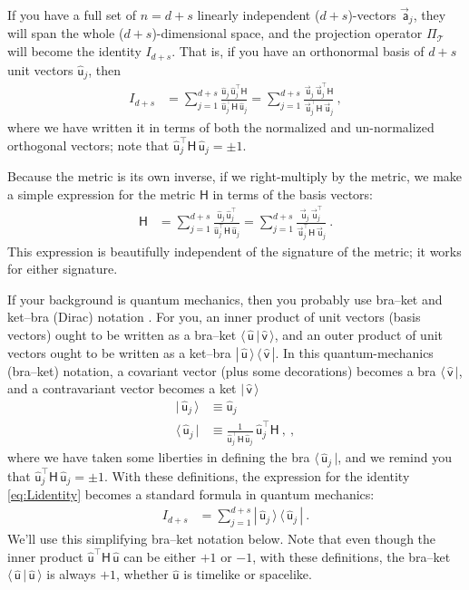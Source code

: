 \documentclass{article}
\newcommand{\metric}{\mathsf{H}}
\newcommand{\proj}{\mathsf{\Pi}}
\newcommand\upvec[1]{\!\vec{\,\mathrm{#1}}}
\newcommand{\Lvec}[1]{\upvec{\mathsf{#1}}} %
\newcommand{\Lhat}[1]{\hat{\mathsf{#1}}} %
\newcommand{\bra}[1]{\langle\,{#1}\,|}
\newcommand{\ket}[1]{|\,{#1}\,\rangle}
\newcommand{\braket}[2]{\langle\,{#1}\,|\,{#2}\,\rangle}
\newcommand{\ketbra}[2]{|\,{#1}\,\rangle\,\langle\,{#2}\,|}
\newcommand{\plus}{\!+\!} %
\begin{document}
If you have a full set of $n=d+s$ linearly independent ($d\plus s$)-vectors $\Lvec{a}_j$, they will span the whole ($d\plus s$)-dimensional space, and the projection operator $\proj_\mathscr{T}$ will become the identity $I_{d+s}$.
That is, if you have an orthonormal basis of $d+s$ unit vectors $\Lhat{u}_j$, then
\begin{align}
    I_{d+s} &= \sum_{j=1}^{d+s} \frac{\Lhat{u}_j\,\Lhat{u}_j^\top\metric}{\Lhat{u}_j^\top\metric\,\Lhat{u}_j} = \sum_{j=1}^{d+s} \frac{\Lvec{u}_j\,\Lvec{u}_j^\top\metric}{\Lvec{u}_j^\top\metric\,\Lvec{u}_j} \label{eq:Lidentity} ~,
\end{align}
where we have written it in terms of both the normalized and un-normalized orthogonal vectors; note that $\Lhat{u}_j^\top\metric\,\Lhat{u}_j=\pm 1$.

Because the metric is its own inverse, if we right-multiply by the metric, we make a simple expression for the metric $\metric$ in terms of the basis vectors:
\begin{align}
    \metric &= \sum_{j=1}^{d+s} \frac{\Lhat{u}_j\,\Lhat{u}_j^\top}{\Lhat{u}_j^\top\metric\,\Lhat{u}_j} = \sum_{j=1}^{d+s} \frac{\Lvec{u}_j\,\Lvec{u}_j^\top}{\Lvec{u}_j^\top\metric\,\Lvec{u}_j} ~.
\end{align}
This expression is beautifully independent of the signature of the metric; it works for either signature.

If your background is quantum mechanics, then you probably use bra--ket and ket--bra (Dirac) notation \cite{dirac}.
For you, an inner product of unit vectors (basis vectors) ought to be written as a bra--ket $\braket{\Lhat{u}}{\Lhat{v}}$, and an outer product of unit vectors ought to be written as a ket--bra $\ketbra{\Lhat{u}}{\Lhat{v}}$.
In this quantum-mechanics (bra--ket) notation, a covariant vector (plus some decorations) becomes a bra $\bra{\Lhat{v}}$, and a contravariant vector becomes a ket $\ket{\Lhat{v}}$
\begin{align}
    \ket{\Lhat{u}_j} &\equiv \Lhat{u}_j \label{eq:ket}\\
    \bra{\Lhat{u}_j} &\equiv \frac{1}{\Lhat{u}_j^\top\metric\,\Lhat{u}_j}\,\Lhat{u}_j^\top\metric ~,\label{eq:bra} ~,
\end{align}
where we have taken some liberties in defining the bra $\bra{\Lhat{u}_j}$, and we remind you that $\Lhat{u}_j^\top\metric\,\Lhat{u}_j=\pm 1$.
With these definitions, the expression for the identity \eqref{eq:Lidentity} becomes a standard formula in quantum mechanics:
\begin{align}
    I_{d+s} &= \sum_{j=1}^{d+s} \ketbra{\Lhat{u}_j}{\Lhat{u}_j} \label{eq:LidentityQM} ~.
\end{align}
We'll use this simplifying bra--ket notation below.
Note that even though the inner product $\Lhat{u}^\top\metric\,\Lhat{u}$ can be either $+1$ or $-1$, with these definitions, the bra--ket $\braket{\Lhat{u}}{\Lhat{u}}$ is always $+1$, whether $\Lhat{u}$ is timelike or spacelike.
\end{document}
